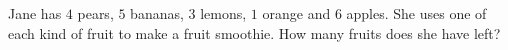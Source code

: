 Jane has $4$ pears, $5$ bananas, $3$ lemons, $1$ orange and $6$ apples. She uses one of each kind of fruit to make a fruit smoothie. How many fruits does she have left?
